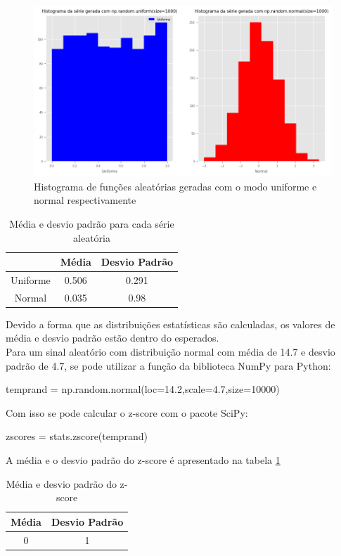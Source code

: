 \documentclass[12pt,a4paper,portuguese]{article}
\begin{document}
\begin{figure}[H]
	\centering
	\includegraphics[width=0.99\linewidth]{lista1-3a}
	\caption{Histograma de funções aleatórias geradas com o modo uniforme e normal respectivamente}
	\label{fig:lista1-3a}
\end{figure}
	
	\begin{table}[H]
\centering

	\begin{tabular}{|c|c|c|}
		\hline
		& Média & Desvio Padrão \\
		\hline
		Uniforme & 0.506 & 0.291 \\
		\hline
		Normal & 0.035 & 0.98 \\
		\hline
	\end{tabular}
	\caption{Média e desvio padrão para cada série aleatória}
		\end{table}
Devido a forma que as distribuições estatísticas são calculadas, os valores de média e desvio padrão estão dentro do esperados.  \\

Para um sinal aleatório com distribuição normal com média de 14.7 e desvio padrão de 4.7, se pode utilizar a função da biblioteca NumPy para Python:
\begin{python}
temprand = np.random.normal(loc=14.2,scale=4.7,size=10000)
\end{python}
Com isso se pode calcular o z-score com o pacote SciPy:
\begin{python}
zscores = stats.zscore(temprand)
\end{python}
A média e o desvio padrão do z-score é apresentado na tabela \ref{szsoretab}
	\begin{table}[H]
	\centering
\begin{tabular}{|c|c|}
	\hline
	Média & Desvio Padrão \\
	\hline
	0 & 1 \\
	\hline
\end{tabular}

\caption{Média e desvio padrão do z-score}
\label{szsoretab}
\end{table}
\end{document}
